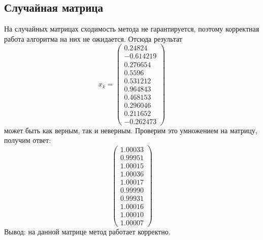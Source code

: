 \documentclass[../../report.tex]{subfiles}
\begin{document}
\subsection{Случайная матрица}
На случайных матрицах сходимость метода не гарантируется, 
поэтому корректная работа алгоритма на них не ожидается. Отсюда результат
\[
x_k = 
\begin{pmatrix} 
  0.24824  \\ 
 -0.614219 \\ 
  0.276654 \\ 
  0.5596   \\ 
  0.531212 \\ 
  0.964843 \\ 
  0.468153 \\ 
  0.296046 \\ 
  0.211652 \\ 
 -0.262473 
\end{pmatrix}
\]
может быть как верным, так и неверным. Проверим это умножением на матрицу, получим ответ:
\[
\begin{pmatrix}
  1.00033 \\
  0.99951 \\
  1.00015 \\
  1.00036 \\
  1.00017 \\
  0.99990 \\
  0.99931 \\
  1.00016 \\
  1.00010 \\
  1.00007
\end{pmatrix}
\]
Вывод: на данной матрице метод работает корректно.
\end{document}
